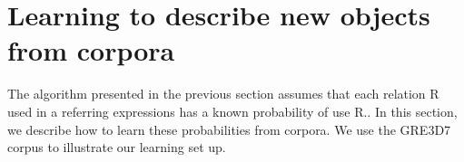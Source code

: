 \section{Learning to describe new objects from corpora}\label{sec:learning}

The algorithm presented in the previous section assumes that each relation R used in a referring expressions has a known probability of use R.\puse. In this section, we describe how to learn these probabilities from corpora.  %
We use the GRE3D7 corpus to illustrate our learning set up. 



